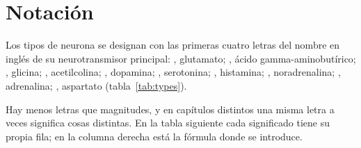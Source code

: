 \chapter{Notación}
\label{sec:notation}

Los tipos de neurona se designan con las primeras cuatro letras del nombre en inglés de su neurotransmisor principal: , glutamato; , ácido gamma-aminobutírico; , glicina; , acetilcolina; , dopamina; , serotonina; , histamina; , noradrenalina; , adrenalina; , aspartato (tabla~\ref{tab:types}).

Hay menos letras que magnitudes, y en capítulos distintos una misma letra a veces significa cosas distintas. En la tabla siguiente cada significado tiene su propia fila; en la columna derecha está la fórmula donde se introduce.

